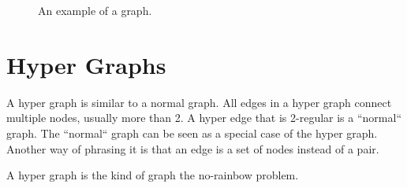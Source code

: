 \documentclass[msc,lith,english]{liuthesis}
\begin{document}
\begin{center}
\begin{figure}[h]
\centering
{}
  \caption{An example of a graph.}
  \label{figGraphExample}
\end{figure}
\end{center}


\section{Hyper Graphs}
A hyper graph is similar to a normal graph.
All edges in a hyper graph connect multiple nodes, usually more than 2.
A hyper edge that is 2-regular is a ``normal`` graph.
The ``normal`` graph can be seen as a special case of the hyper graph.
Another way of phrasing it is that an edge is a set of nodes instead of a pair.

A hyper graph is the kind of graph the no-rainbow problem.
\end{document}
